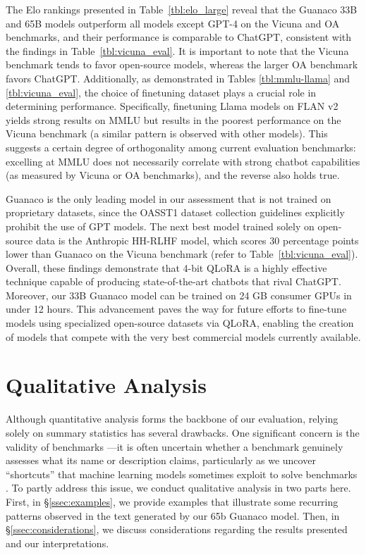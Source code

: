 The Elo rankings presented in Table~\ref{tbl:elo_large} reveal that the {Guanaco} 33B and 65B models outperform all models except GPT-4 on the Vicuna and OA benchmarks, and their performance is comparable to ChatGPT, consistent with the findings in Table~\ref{tbl:vicuna_eval}. It is important to note that the Vicuna benchmark tends to favor open-source models, whereas the larger OA benchmark favors ChatGPT. Additionally, as demonstrated in Tables \ref{tbl:mmlu-llama} and \ref{tbl:vicuna_eval}, the choice of finetuning dataset plays a crucial role in determining performance. Specifically, finetuning Llama models on FLAN v2 yields strong results on MMLU but results in the poorest performance on the Vicuna benchmark (a similar pattern is observed with other models). This suggests a certain degree of orthogonality among current evaluation benchmarks: excelling at MMLU does not necessarily correlate with strong chatbot capabilities (as measured by Vicuna or OA benchmarks), and the reverse also holds true.

{Guanaco} is the only leading model in our assessment that is not trained on proprietary datasets, since the OASST1 dataset collection guidelines explicitly prohibit the use of GPT models. The next best model trained solely on open-source data is the Anthropic HH-RLHF model, which scores 30 percentage points lower than {Guanaco} on the Vicuna benchmark (refer to Table~\ref{tbl:vicuna_eval}). Overall, these findings demonstrate that 4-bit \textsc{QLoRA} is a highly effective technique capable of producing state-of-the-art chatbots that rival ChatGPT. Moreover, our 33B {Guanaco} model can be trained on 24 GB consumer GPUs in under 12 hours. This advancement paves the way for future efforts to fine-tune models using specialized open-source datasets via \textsc{QLoRA}, enabling the creation of models that compete with the very best commercial models currently available.

\section{Qualitative Analysis}

Although quantitative analysis forms the backbone of our evaluation, relying solely on summary statistics has several drawbacks. One significant concern is the validity of benchmarks \citep{liao2021we}—it is often uncertain whether a benchmark genuinely assesses what its name or description claims, particularly as we uncover “shortcuts” that machine learning models sometimes exploit to solve benchmarks \citep{gururangan2018annotation, poliak2018hypothesis}. To partly address this issue, we conduct qualitative analysis in two parts here. First, in \S\ref{ssec:examples}, we provide examples that illustrate some recurring patterns observed in the text generated by our 65b {Guanaco} model. Then, in \S\ref{ssec:considerations}, we discuss considerations regarding the results presented and our interpretations.

